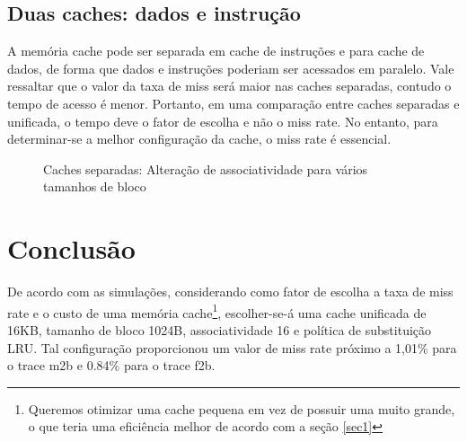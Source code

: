 \documentclass[12pt,a4paper]{article}
\begin{document}
\subsection{Duas caches:  dados e  instrução}
A memória cache pode ser separada em cache de instruções e para cache de dados,
de forma que dados e instruções poderiam ser acessados em paralelo. 
Vale ressaltar que o valor da taxa de miss será maior nas caches
separadas, contudo o tempo de acesso é menor.
Portanto, em uma comparação entre caches separadas e unificada, o tempo deve o fator de
escolha e não o miss rate. 
No entanto, para determinar-se a melhor configuração da cache, o miss
rate é essencial.


\begin{figure}[h!]
\caption{Caches separadas:  Alteração de associatividade para vários tamanhos de bloco}
\end{figure}

\section{Conclusão}
De acordo com as simulações, considerando como fator de
escolha a taxa de miss rate e o custo de uma memória
cache\footnote{Queremos otimizar uma cache pequena em vez de possuir
  uma muito grande, o que teria uma eficiência melhor de acordo com a
seção \ref{sec1}}, escolher-se-á uma cache unificada de 16KB, tamanho
de bloco 1024B, associatividade 16 e política de substituição LRU.
Tal configuração proporcionou um valor de miss rate próximo a 1,01\% para o
trace m2b e 0.84\% para o trace f2b.
\end{document}
